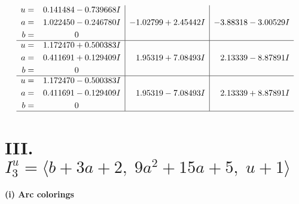 \documentclass[1p]{elsarticle_modified}
\theoremstyle{definition}
\begin{document}
$$\begin{array}{c|c|c}
\begin{aligned}
u &= \phantom{-}0.141484 - 0.739668 I \\
a &= \phantom{-}1.022450 - 0.246780 I \\
b &= \phantom{-0.000000 } 0\end{aligned}
 & -1.02799 + 2.45442 I & -3.88318 - 3.00529 I \\ \hline\begin{aligned}
u &= \phantom{-}1.172470 + 0.500383 I \\
a &= \phantom{-}0.411691 + 0.129409 I \\
b &= \phantom{-0.000000 } 0\end{aligned}
 & \phantom{-}1.95319 + 7.08493 I & \phantom{-}2.13339 - 8.87891 I \\ \hline\begin{aligned}
u &= \phantom{-}1.172470 - 0.500383 I \\
a &= \phantom{-}0.411691 - 0.129409 I \\
b &= \phantom{-0.000000 } 0\end{aligned}
 & \phantom{-}1.95319 - 7.08493 I & \phantom{-}2.13339 + 8.87891 I\\
 \hline 
 \end{array}$$\newpage\newpage\renewcommand{\arraystretch}{1}
\centering \section*{III. $I^u_{3}= \langle b+3 a+2,\;9 a^2+15 a+5,\;u+1 \rangle$}
\flushleft \textbf{(i) Arc colorings}\\
\end{document}
